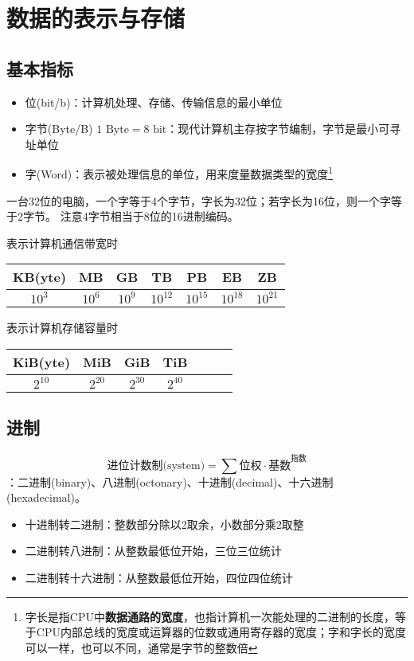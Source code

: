 
\section{数据的表示与存储}
\subsection{基本指标}
\begin{itemize}
	\item 位(bit/b)：计算机处理、存储、传输信息的最小单位
	\item 字节(Byte/B) $1\text{ Byte}=8\text{ bit}$：现代计算机主存按字节编制，字节是最小可寻址单位
	\item 字(Word)：表示被处理信息的单位，用来度量数据类型的宽度\footnote{字长是指CPU中\textbf{数据通路的宽度}，也指计算机一次能处理的二进制的长度，等于CPU内部总线的宽度或运算器的位数或通用寄存器的宽度；字和字长的宽度可以一样，也可以不同，通常是字节的整数倍}
\end{itemize}
\par 一台32位的电脑，一个字等于4个字节，字长为32位；若字长为16位，则一个字等于2字节。
注意4字节相当于8位的16进制编码。

表示计算机通信带宽时
\begin{center}
\begin{tabular}{ccccccc}\hline
KB(yte) & MB & GB & TB & PB & EB & ZB\\\hline
$10^3$ & $10^6$ & $10^9$ & $10^{12}$ & $10^{15}$ & $10^{18}$ & $10^{21}$\\\hline
\end{tabular}
\end{center}

表示计算机存储容量时
\begin{center}
\begin{tabular}{ccccccc}\hline
KiB(yte) & MiB & GiB & TiB\\\hline
$2^{10}$ & $2^{20}$ & $2^{30}$ & $2^{40}$\\\hline
\end{tabular}
\end{center}

\subsection{进制}
\[\text{进位计数制(system)}=\sum\text{位权}\cdot\text{基数}^\text{指数}\]
：二进制(binary)、八进制(octonary)、十进制(decimal)、十六进制(hexadecimal)。
\begin{itemize}
	\item 十进制转二进制：整数部分除以2取余，小数部分乘2取整
	\item 二进制转八进制：从整数最低位开始，三位三位统计
	\item 二进制转十六进制：从整数最低位开始，四位四位统计
\end{itemize}


